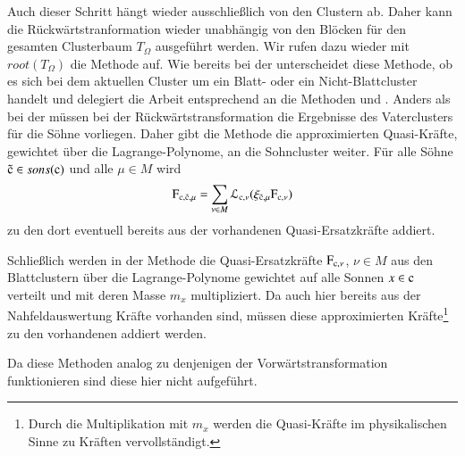     Auch dieser Schritt hängt wieder ausschließlich von den Clustern ab. Daher kann die Rückwärtstranformation wieder unabhängig von den Blöcken für den gesamten Clusterbaum $T_\Omega$ ausgeführt
    werden. Wir rufen dazu wieder mit $root(T_\Omega)$ die Methode  auf. Wie bereits bei der \vorw unterscheidet diese Methode, ob es sich bei
    dem aktuellen Cluster um ein Blatt- oder ein Nicht-Blattcluster handelt und delegiert die Arbeit entsprechend an die Methoden  und 
    . Anders als bei der \vorw müssen bei der Rückwärtstransformation die Ergebnisse des Vaterclusters für die Söhne vorliegen. Daher gibt die
    Methode  die approximierten Quasi-Kräfte, gewichtet über die Lagrange-Polynome, an die Sohncluster weiter. Für alle Söhne $\tilde{\tcode{c}} \in sons(\tcode{c})$
    und alle $\mu \in M$ wird
    \[
      \tcode{F}_{\tcode{c},\tilde{\tcode{c}},\mu} = \sum_{\nu \in M} \lag_{\tcode{c},\nu}(\xi_{\tilde{\tcode{c}},\mu} \tcode{F}_{\tcode{c},\nu})
    \]
    zu den dort eventuell bereits aus der \koppl vorhandenen Quasi-Ersatzkräfte addiert.
    
    Schließlich werden in der Methode  die Quasi-Ersatzkräfte $\tcode{F}_{\tcode{c},\nu}$, $\nu \in M$ aus den Blattclustern über die Lagrange-Polynome gewichtet auf alle
    Sonnen $x \in \tcode{c}$ verteilt und mit deren Masse $m_x$ multipliziert. Da auch hier bereits aus der Nahfeldauswertung Kräfte vorhanden sind, müssen diese approximierten Kräfte\footnote{Durch die
    Multiplikation mit $m_x$ werden die Quasi-Kräfte im physikalischen Sinne zu Kräften vervollständigt.} zu den vorhandenen addiert werden.
    
    Da diese Methoden analog zu denjenigen der Vorwärtstransformation funktionieren sind diese hier nicht aufgeführt.

  \clearpage